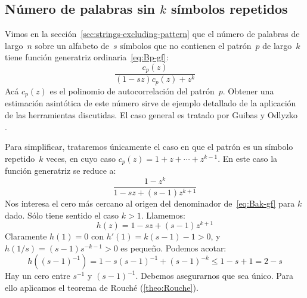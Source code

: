 %

\subsection{Número de palabras sin $k$ símbolos repetidos}
\label{sec:asymptotics-words-no-pattern}

  Vimos en la sección~\ref{sec:strings-excluding-pattern}
  que el número de palabras de largo~\(n\)
  sobre un alfabeto de~\(s\) símbolos
  que no contienen el patrón~\(p\)
  de largo~\(k\)
  tiene función generatriz ordinaria~\eqref{eq:Bp-gf}:
  \begin{equation*}
    \frac{c_p(z)}{(1 - s z) c_p(z) + z^k}
  \end{equation*}
  Acá \(c_p(z)\)
  es el polinomio de autocorrelación del patrón~\(p\).
  Obtener una estimación asintótica de este número
  sirve de ejemplo detallado
  de la aplicación de las herramientas discutidas.
  El caso general es tratado por Guibas y Odlyzko~%
    \cite{guibas81:_strin_overl_patterns}.

  Para simplificar,
  trataremos únicamente el caso en que el patrón
  es un símbolo repetido~\(k\) veces,
  en cuyo caso \(c_p(z) = 1 + z + \dotsb + z^{k - 1}\).
  En este caso la función generatriz se reduce a:
  \begin{equation}
    \label{eq:Bak-gf}
    \frac{1 - z^k}{1 - s z + (s - 1) z^{k + 1}}
  \end{equation}
  Nos interesa el cero más cercano al origen
  del denominador de~\eqref{eq:Bak-gf} para \(k\) dado.
  Sólo tiene sentido el caso \(k > 1\).
  Llamemos:
  \begin{equation}
    \label{eq:h-definition}
    h(z)
      = 1 - s z + (s - 1) z^{k + 1}
  \end{equation}
  Claramente \(h(1) = 0\)
  con \(h'(1) = k (s - 1) - 1 > 0\),
  y \(h(1/s) = (s - 1) s^{-k - 1} > 0\) es pequeño.
  Podemos acotar:
  \begin{equation*}
    h((s - 1)^{-1})
      = 1 - s (s - 1)^{-1} + (s - 1)^{-k}
      \le 1 - s + 1
      = 2 - s
  \end{equation*}
  Hay un cero entre \(s^{-1}\) y \((s - 1)^{-1}\).
  Debemos asegurarnos que sea único.
  Para ello aplicamos el teorema de Rouché
  (\ref{theo:Rouche}).

